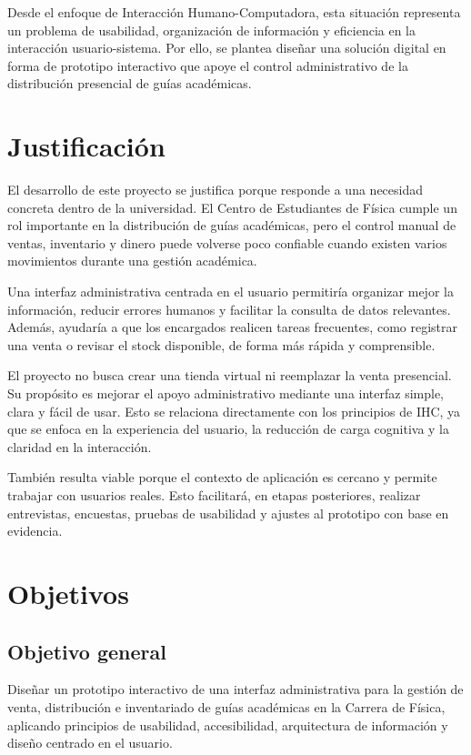\documentclass[12pt,letterpaper]{article}
\begin{document}
Desde el enfoque de Interacción Humano-Computadora, esta situación representa un problema de usabilidad, organización de información y eficiencia en la interacción usuario-sistema. Por ello, se plantea diseñar una solución digital en forma de prototipo interactivo que apoye el control administrativo de la distribución presencial de guías académicas.

\section{Justificación}

El desarrollo de este proyecto se justifica porque responde a una necesidad concreta dentro de la universidad. El Centro de Estudiantes de Física cumple un rol importante en la distribución de guías académicas, pero el control manual de ventas, inventario y dinero puede volverse poco confiable cuando existen varios movimientos durante una gestión académica.

Una interfaz administrativa centrada en el usuario permitiría organizar mejor la información, reducir errores humanos y facilitar la consulta de datos relevantes. Además, ayudaría a que los encargados realicen tareas frecuentes, como registrar una venta o revisar el stock disponible, de forma más rápida y comprensible.

El proyecto no busca crear una tienda virtual ni reemplazar la venta presencial. Su propósito es mejorar el apoyo administrativo mediante una interfaz simple, clara y fácil de usar. Esto se relaciona directamente con los principios de IHC, ya que se enfoca en la experiencia del usuario, la reducción de carga cognitiva y la claridad en la interacción.

También resulta viable porque el contexto de aplicación es cercano y permite trabajar con usuarios reales. Esto facilitará, en etapas posteriores, realizar entrevistas, encuestas, pruebas de usabilidad y ajustes al prototipo con base en evidencia.

\section{Objetivos}

\subsection{Objetivo general}

Diseñar un prototipo interactivo de una interfaz administrativa para la gestión de venta, distribución e inventariado de guías académicas en la Carrera de Física, aplicando principios de usabilidad, accesibilidad, arquitectura de información y diseño centrado en el usuario.
\end{document}
